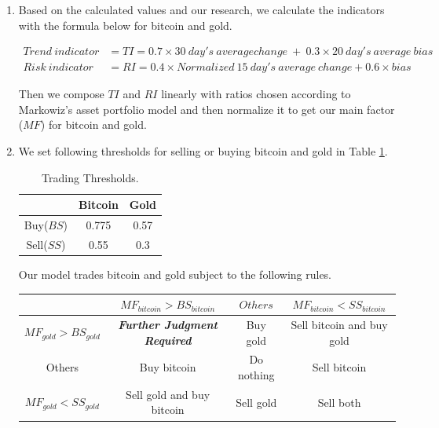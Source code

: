 \documentclass[12pt,a4paper]{article}
\begin{document}
\begin{spacing}{1.2}
\begin{enumerate}
	\item Based on the calculated values and our research, we calculate the indicators with the formula below for bitcoin and gold. 
	

\begin{align*}
	Trend \ indicator &= TI = 0.7 \times 30 \ day's \ average change \ + \ 0.3 \times 20 \ day's \ average \ bias \\
	Risk \ indicator &= RI = 0.4 \times Normalized \ 15 \ day's \ average \ change + 0.6 \times bias
\end{align*}
	
	Then we compose $TI$ and $RI$ linearly with ratios chosen according to Markowiz's asset portfolio model and then normalize it to get our main factor ($MF$) for bitcoin and gold. 
	
	\item We set following thresholds for selling or buying bitcoin and gold in Table \ref{table:memo_threshold}.
	
	\begin{table}[H]
		\renewcommand{\arraystretch}{1.5}
		\caption{Trading Thresholds.}
		\label{table:memo_threshold}
		\begin{center}
			{\footnotesize
				\begin{tabular}{c c c}
					\toprule
					{ } & {Bitcoin} & {Gold} \\
					\midrule
					Buy($BS$) & 0.775 & 0.57 \\
					Sell($SS$) & 0.55 & 0.3 \\
					\bottomrule
			\end{tabular}}
		\end{center}	
	\end{table}

	Our model trades bitcoin and gold subject to the following rules.
	
	\begin{center}
		\begin{tabular}{ |c|c|c|c| } 
			\hline
			 & $MF_{bitcoin} > BS_{bitcoin}$ & $Others$ & $MF_{bitcoin} < SS_{bitcoin}$ \\ 
			\hline
			$MF_{gold} > BS_{gold}$ & \textbf{\textit{Further Judgment Required}}  & Buy gold & Sell bitcoin and buy gold  \\ 
			\hline
			Others & Buy bitcoin & Do nothing & Sell bitcoin \\
			\hline
			$MF_{gold} < SS_{gold}$ & Sell gold and buy bitcoin & Sell gold & Sell both \\ 
			\hline
		\end{tabular}
	\end{center}


\end{enumerate}
\end{spacing}
\end{document}

